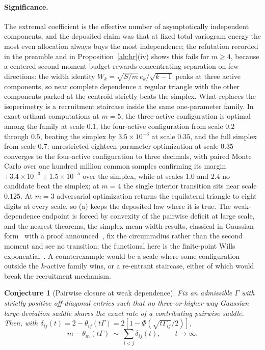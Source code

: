 \documentclass[11pt]{article}
\newtheorem{conjecture}{Conjecture}
\theoremstyle{definition}
\begin{document}
\paragraph{Significance.}
The extremal coefficient is the effective number of asymptotically independent components, and the deposited claim was that at fixed total variogram energy the most even allocation always buys the most independence; the refutation recorded in the preamble and in Proposition~\ref{ah:hr}(iv) shows this fails for $m\ge4$, because a centered second-moment budget rewards concentrating separation on few directions: the width identity $W_k=\sqrt{S/m}\,e_k/\sqrt{k-1}$ peaks at three active components, so near complete dependence a regular triangle with the other components parked at the centroid strictly beats the simplex.  What replaces the isoperimetry is a recruitment staircase inside the same one-parameter family.  In exact orthant computations at $m=5$, the three-active configuration is optimal among the family at scale $0.1$, the four-active configuration from scale $0.2$ through $0.5$, beating the simplex by $3.5\times10^{-3}$ at scale $0.35$, and the full simplex from scale $0.7$; unrestricted eighteen-parameter optimization at scale $0.35$ converges to the four-active configuration to three decimals, with paired Monte Carlo over one hundred million common samples confirming its margin $+3.4\times10^{-3}\pm1.5\times10^{-5}$ over the simplex, while at scales $1.0$ and $2.4$ no candidate beat the simplex; at $m=4$ the single interior transition sits near scale $0.125$.  At $m=3$ adversarial optimization returns the equilateral triangle to eight digits at every scale, so (a) keeps the deposited law where it is true.  The weak-dependence endpoint is forced by convexity of the pairwise deficit at large scale, and the nearest theorems, the simplex mean-width results, classical in Gaussian form~\cite{KLZ17} with a proof announced~\cite{Gol21}, fix the circumradius rather than the second moment and see no transition; the functional here is the finite-point Wills exponential~\cite{Vit96}.  A counterexample would be a scale where some configuration outside the $k$-active family wins, or a re-entrant staircase, either of which would break the recruitment mechanism.

\begin{conjecture}[Pairwise closure at weak dependence]\label{ah2}
Fix an admissible $\Gamma$ with strictly positive off-diagonal entries such that no three-or-higher-way Gaussian large-deviation saddle shares the exact rate of a contributing pairwise saddle.  Then, with $\delta_{ij}(t)=2-\theta_{ij}(t\Gamma)=2[1-\Phi(\sqrt{t\Gamma_{ij}}/2)]$,
\[
m-\theta_m(t\Gamma)\ \sim\ \sum_{i<j}\delta_{ij}(t),\qquad t\to\infty.
\]
\end{conjecture}
\end{document}
